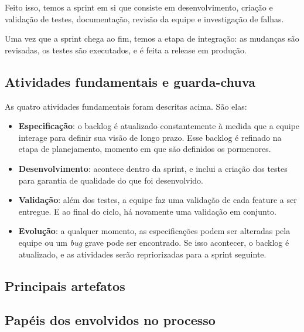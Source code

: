 \documentclass[12pt]{article}
\begin{document}
Feito isso, temos a sprint em si que consiste em desenvolvimento, criação e validação de testes, documentação, revisão da equipe e investigação de falhas.

Uma vez que a sprint chega ao fim, temos a etapa de integração: as mudanças são revisadas, os testes são executados, e é feita a release em produção.

\subsection*{Atividades fundamentais e guarda-chuva}

As quatro atividades fundamentais foram descritas acima. São elas:

\begin{itemize}
	\item \textbf{Especificação}: o backlog é atualizado constantemente à medida que a equipe interage para definir sua visão de longo prazo. Esse backlog é refinado na etapa de planejamento, momento em que são definidos os pormenores.
	\item \textbf{Desenvolvimento}: acontece dentro da sprint, e inclui a criação dos testes para garantia de qualidade do que foi desenvolvido.
	\item \textbf{Validação}: além dos testes, a equipe faz uma validação de cada feature a ser entregue. E ao final do ciclo, há novamente uma validação em conjunto.
	\item \textbf{Evolução}: a qualquer momento, as especificações podem ser alteradas pela equipe ou um \textit{bug} grave pode ser encontrado. Se isso acontecer, o backlog é atualizado, e as atividades serão repriorizadas para a sprint seguinte.
\end{itemize}

\subsection*{Principais artefatos}


\subsection*{Papéis dos envolvidos no processo}
\end{document}
